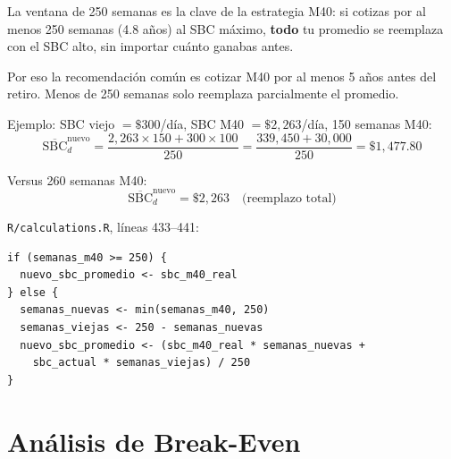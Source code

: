 \documentclass[11pt,a4paper]{report}
\theoremstyle{remark}
\begin{document}
\begin{tcolorbox}[colback=green!5!white, colframe=green!50!black, title=\textbf{Intuici\'on}]
La ventana de 250 semanas es la clave de la estrategia M40: si cotizas por al menos 250 semanas (4.8 a\~nos) al SBC m\'aximo, \textbf{todo} tu promedio se reemplaza con el SBC alto, sin importar cu\'anto ganabas antes.

Por eso la recomendaci\'on com\'un es cotizar M40 por al menos 5 a\~nos antes del retiro. Menos de 250 semanas solo reemplaza parcialmente el promedio.

Ejemplo: SBC viejo $= \$300$/d\'ia, SBC M40 $= \$2{,}263$/d\'ia, 150 semanas M40:
\[
\overline{\text{SBC}}_d^{\text{nuevo}} = \frac{2{,}263 \times 150 + 300 \times 100}{250} = \frac{339{,}450 + 30{,}000}{250} = \$1{,}477.80
\]

Versus 260 semanas M40:
\[
\overline{\text{SBC}}_d^{\text{nuevo}} = \$2{,}263 \quad \text{(reemplazo total)}
\]
\end{tcolorbox}

\begin{tcolorbox}[colback=orange!5!white, colframe=orange!75!black, title=\textbf{Aplicaci\'on en C\'odigo}]
\texttt{R/calculations.R}, l\'ineas 433--441:
\begin{lstlisting}
if (semanas_m40 >= 250) {
  nuevo_sbc_promedio <- sbc_m40_real
} else {
  semanas_nuevas <- min(semanas_m40, 250)
  semanas_viejas <- 250 - semanas_nuevas
  nuevo_sbc_promedio <- (sbc_m40_real * semanas_nuevas +
    sbc_actual * semanas_viejas) / 250
}
\end{lstlisting}
\end{tcolorbox}

\section{An\'alisis de Break-Even}
\end{document}
